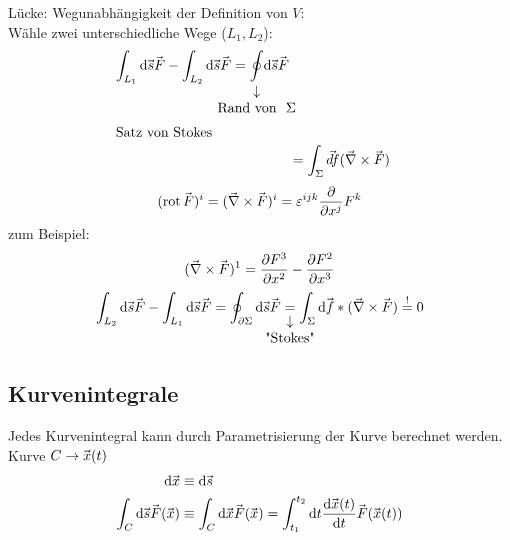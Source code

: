 \documentclass[a4paper]{scrartcl}
\DeclareMathOperator{\rot}{rot}
\renewcommand{\d}{\mathrm{d}}
\renewcommand{\v}[1]{\mathrlap{\vec{\mkern-2mu\phantom{#1}}}#1}
\theoremstyle{definition}
\theoremstyle{plain}
\theoremstyle{remark}
\theoremstyle{remark}
\begin{document}
Lücke: Wegunabhängigkeit der Definition von $V$: \\
     Wähle zwei unterschiedliche Wege ($L_1, L_2$):
\begin{align*}
\int_{L_1}\d\v s \v F - \int_{L_2}\d \v s \v F = \underarrow[\oint]{\text{Rand von } $\Sigma$} \d\v s\v F \\
\intertext{Satz von Stokes}
&= \int_{\Sigma}\v{d f}(\v\nabla \times\v F)
\end{align*}
\[(\rot \v F)^i = (\v\nabla \times \v F)^i = \varepsilon^{ijk}\frac{\partial}{\partial x^j} F^k\]
zum Beispiel:
\[(\v\nabla\times\v F)^1 = \frac{\partial F^3}{\partial x^2} - \frac{\partial F^2}{\partial x^3}\]
\[\int_{L_2}\d \v s \v F - \int_{L_1}\d \v s\v F = \oint_{\partial \Sigma} \d\v s \v F \underarrow[=]{\text{"Stokes"}} \int_{\Sigma}\d\v f*(\v\nabla\times\v F) \overset{!}{=} 0\]
\subsection{Kurvenintegrale}
\label{sec-4-4}
Jedes Kurvenintegral kann durch Parametrisierung der Kurve berechnet werden.
Kurve $C \to \v x(t)$
\begin{align*}
\d \v x &\equiv \d \v s \\
\int_C \d \v s \v F(\v x) &\equiv \int_C \d \v x \v F(\v x) = \int_{t_1}^{t_2} \d t \frac{\d \v x(t)}{\d t} \v F(\v x(t))
\end{align*}
\end{document}
